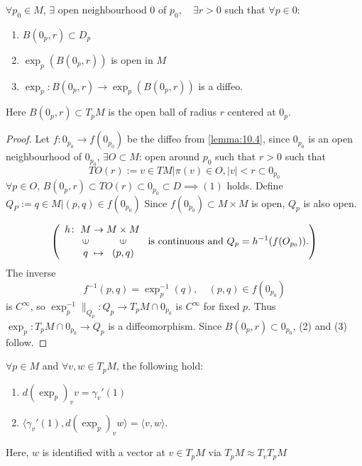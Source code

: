 \begin{lemma}\label{lemma:10.5}
    $\forall p_0 \in M$, $\exists$ open neighbourhood $0$ of $p_0, \quad \exists r >0$ such that $\forall p \in 0$:
    \begin{enumerate}
        \item $B(0_p,r) \subset D_p$
        \item $\exp_p (B(0_p,r))$ is open in $M$
        \item $\exp_p : B(0_p,r) \to \exp_p(B(0_p,r))$ is a diffeo.
    \end{enumerate}
    Here $B(0_p,r) \subset T_p M$ is the open ball of radius $r$ centered at $0_p$.
\end{lemma}
\begin{proof}
    Let $f: 0_{p_0} \to f(0_{p_0})$ be the diffeo from \autoref{lemma:10.4}, since $0_{p_0}$ is an open neighbourhood of $0_{p_0}$,
    $\exists O \subset M$: open around $p_0$ such that $r>0$ such that
    \[
    TO(r) := {v \in TM | \pi(v) \in O, |v| <r} \subset 0_{p_0}
    \]
    $\forall p \in O$, $B(0_p,r) \subset TO(r) \subset 0_{p_0} \subset D \implies (1)$ holds.
    Define $Q_P := {q \in M| (p,q) \in f(0_{p_0})}$
    Since $f(0_{p_0}) \subset M \times M$ is open, $Q_p$ is also open.

    \[
\left(
\begin{array}{c@{\;}c@{\;}c@{\;}c}
    h \colon & M & \to & M \times M \\
    & \rotatebox[origin=c]{90}{$\in$} & & \rotatebox[origin=c]{90}{$\in$} \\
    & q & \mapsto & (p, q)
\end{array}
\text{ is continuous and } Q_p = h^{-1}(f(O_{p_0})).
\right)
\]
The inverse
\[
f^{-1}(p,q)  = \exp_p^{-1}(q), \quad (p,q) \in f(0_{p_0})
\]
is $C^{\infty}$, so $\exp_p^{-1}\|_{Q_p} : Q_p \to T_p M \cap 0_{p_0}$ is $C^{\infty}$ for fixed $p$.
Thus $\exp_p: T_p M \cap 0_{p_0} \to Q_p$ is a diffeomorphism. Since $B(0_p,r) \subset 0_{p_0}$, (2) and (3) follow.
\end{proof}

\begin{theorem}
    $\forall p \in M$ and $\forall v,w \in T_pM$, the following hold:
    \begin{enumerate}
        \item $d(\exp_p)_v v = \gamma_v'(1)$
        \item $\langle \gamma_v'(1), d(\exp_p)_v w \rangle = \langle v, w \rangle$.
    \end{enumerate}
    Here, $w$ is identified with a vector at $v \in T_pM$ via $T_pM \approx T_v T_pM$
    \label{theorem:10.6}
\end{theorem}

